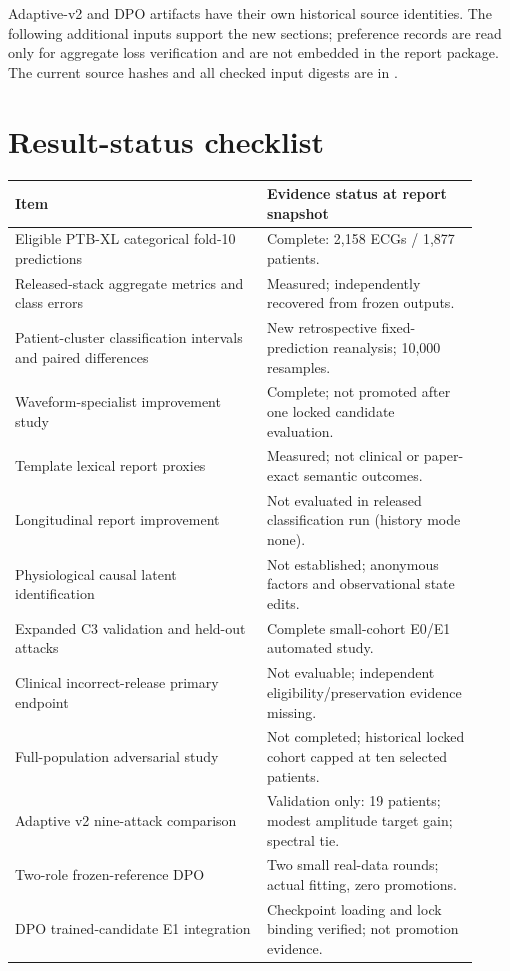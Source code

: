 Adaptive-v2 and DPO artifacts have their own historical source identities. The following additional inputs support the new sections; preference records are read only for aggregate loss verification and are not embedded in the report package. The current source hashes and all checked input digests are in .


\section{Result-status checklist}
\label{app:status}
\begin{longtable}{p{0.50\linewidth}p{0.42\linewidth}}
\toprule Item & Evidence status at report snapshot\\\midrule\endhead
Eligible PTB-XL categorical fold-10 predictions & Complete: 2,158 ECGs / 1,877 patients.\\
Released-stack aggregate metrics and class errors & Measured; independently recovered from frozen outputs.\\
Patient-cluster classification intervals and paired differences & New retrospective fixed-prediction reanalysis; 10,000 resamples.\\
Waveform-specialist improvement study & Complete; not promoted after one locked candidate evaluation.\\
Template lexical report proxies & Measured; not clinical or paper-exact semantic outcomes.\\
Longitudinal report improvement & Not evaluated in released classification run (history mode none).\\
Physiological causal latent identification & Not established; anonymous factors and observational state edits.\\
Expanded C3 validation and held-out attacks & Complete small-cohort E0/E1 automated study.\\
Clinical incorrect-release primary endpoint & Not evaluable; independent eligibility/preservation evidence missing.\\
Full-population adversarial study & Not completed; historical locked cohort capped at ten selected patients.\\
Adaptive v2 nine-attack comparison & Validation only: 19 patients; modest amplitude target gain; spectral tie.\\
Two-role frozen-reference DPO & Two small real-data rounds; actual fitting, zero promotions.\\
DPO trained-candidate E1 integration & Checkpoint loading and lock binding verified; not promotion evidence.\\

\end{longtable}
